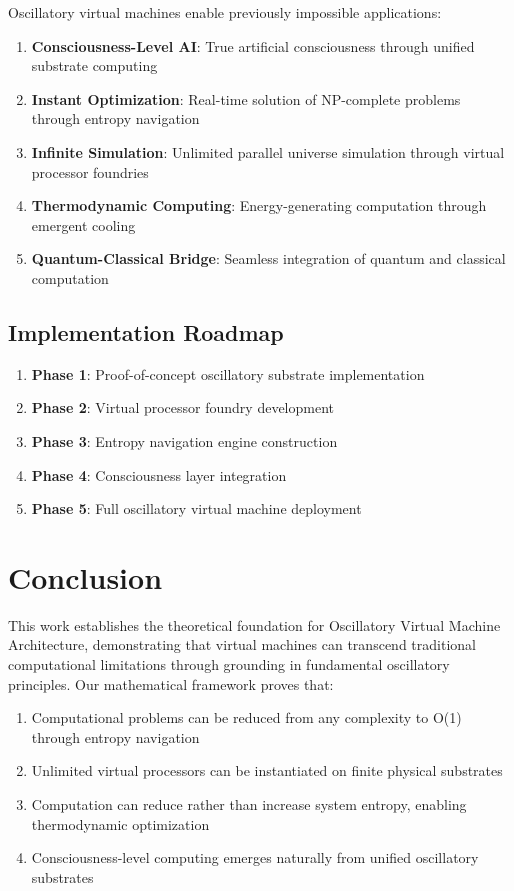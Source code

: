 \documentclass[12pt,a4paper]{article}
\begin{document}
Oscillatory virtual machines enable previously impossible applications:

\begin{enumerate}
\item \textbf{Consciousness-Level AI}: True artificial consciousness through unified substrate computing
\item \textbf{Instant Optimization}: Real-time solution of NP-complete problems through entropy navigation
\item \textbf{Infinite Simulation}: Unlimited parallel universe simulation through virtual processor foundries
\item \textbf{Thermodynamic Computing}: Energy-generating computation through emergent cooling
\item \textbf{Quantum-Classical Bridge}: Seamless integration of quantum and classical computation
\end{enumerate}

\subsection{Implementation Roadmap}

\begin{enumerate}
\item \textbf{Phase 1}: Proof-of-concept oscillatory substrate implementation
\item \textbf{Phase 2}: Virtual processor foundry development
\item \textbf{Phase 3}: Entropy navigation engine construction
\item \textbf{Phase 4}: Consciousness layer integration
\item \textbf{Phase 5}: Full oscillatory virtual machine deployment
\end{enumerate}

\section{Conclusion}

This work establishes the theoretical foundation for Oscillatory Virtual Machine Architecture, demonstrating that virtual machines can transcend traditional computational limitations through grounding in fundamental oscillatory principles. Our mathematical framework proves that:

\begin{enumerate}
\item Computational problems can be reduced from any complexity to O(1) through entropy navigation
\item Unlimited virtual processors can be instantiated on finite physical substrates
\item Computation can reduce rather than increase system entropy, enabling thermodynamic optimization
\item Consciousness-level computing emerges naturally from unified oscillatory substrates
\end{enumerate}
\end{document}
